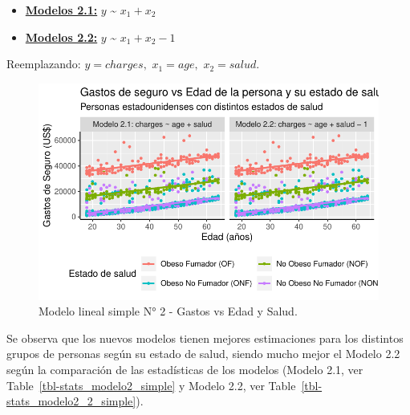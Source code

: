 \documentclass[
  letterpaper,
]{book}
\begin{document}
\begin{itemize}
\item
  \uline{\textbf{Modelos 2.1:}} \(y\) \textasciitilde{} \(x_1 + x_2\)
\item
  \uline{\textbf{Modelos 2.2:}} \(y\) \textasciitilde{}
  \(x_1 + x_2 - 1\)
\end{itemize}

Reemplazando: \(y = charges,\) \(x_1 = age,\) \(x_2 = salud\).

\begin{figure}

{\centering \includegraphics{./index_files/figure-pdf/fig-modelo2_simple-1.pdf}

}

\caption{\label{fig-modelo2_simple}Modelo lineal simple N° 2 - Gastos vs
Edad y Salud.}

\end{figure}

Se observa que los nuevos modelos tienen mejores estimaciones para los
distintos grupos de personas según su estado de salud, siendo mucho
mejor el Modelo 2.2 según la comparación de las estadísticas de los
modelos (Modelo 2.1, ver Table~\ref{tbl-stats_modelo2_simple} y Modelo
2.2, ver Table~\ref{tbl-stats_modelo2_2_simple}).
\end{document}
